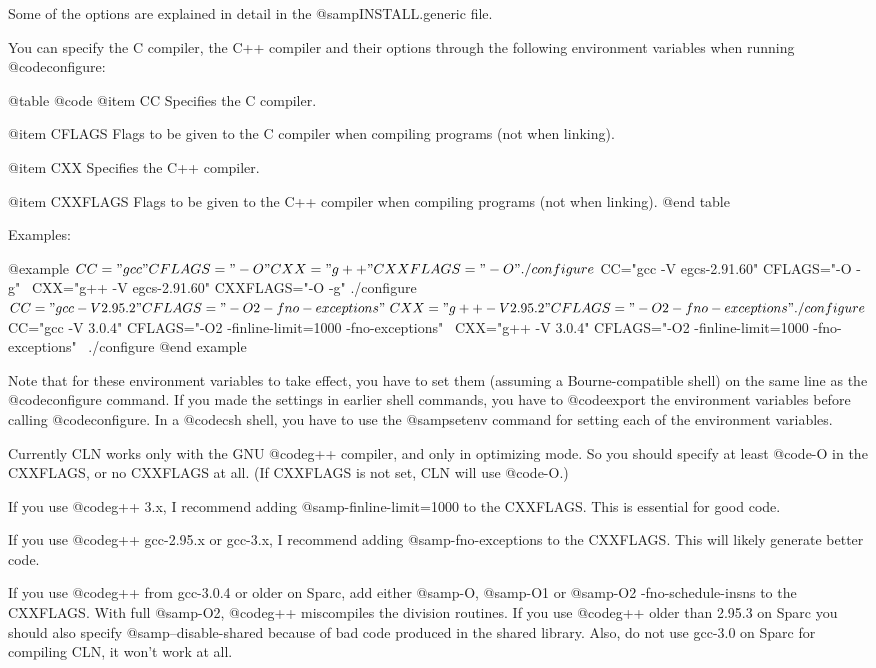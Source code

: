 Some of the options are explained in detail in the @samp{INSTALL.generic} file.

You can specify the C compiler, the C++ compiler and their options through
the following environment variables when running @code{configure}:

@table @code
@item CC
Specifies the C compiler.

@item CFLAGS
Flags to be given to the C compiler when compiling programs (not when linking).

@item CXX
Specifies the C++ compiler.

@item CXXFLAGS
Flags to be given to the C++ compiler when compiling programs (not when linking).
@end table

Examples:

@example
$ CC="gcc" CFLAGS="-O" CXX="g++" CXXFLAGS="-O" ./configure
$ CC="gcc -V egcs-2.91.60" CFLAGS="-O -g" \
  CXX="g++ -V egcs-2.91.60" CXXFLAGS="-O -g" ./configure
$ CC="gcc -V 2.95.2" CFLAGS="-O2 -fno-exceptions" \
  CXX="g++ -V 2.95.2" CFLAGS="-O2 -fno-exceptions" ./configure
$ CC="gcc -V 3.0.4" CFLAGS="-O2 -finline-limit=1000 -fno-exceptions" \
  CXX="g++ -V 3.0.4" CFLAGS="-O2 -finline-limit=1000 -fno-exceptions" \
  ./configure
@end example

Note that for these environment variables to take effect, you have to set
them (assuming a Bourne-compatible shell) on the same line as the
@code{configure} command. If you made the settings in earlier shell
commands, you have to @code{export} the environment variables before
calling @code{configure}. In a @code{csh} shell, you have to use the
@samp{setenv} command for setting each of the environment variables.

Currently CLN works only with the GNU @code{g++} compiler, and only in
optimizing mode. So you should specify at least @code{-O} in the CXXFLAGS,
or no CXXFLAGS at all. (If CXXFLAGS is not set, CLN will use @code{-O}.)

If you use @code{g++} 3.x, I recommend adding @samp{-finline-limit=1000}
to the CXXFLAGS. This is essential for good code.

If you use @code{g++} gcc-2.95.x or gcc-3.x, I recommend adding
@samp{-fno-exceptions} to the CXXFLAGS. This will likely generate better code.

If you use @code{g++} from gcc-3.0.4 or older on Sparc, add either
@samp{-O}, @samp{-O1} or @samp{-O2 -fno-schedule-insns} to the
CXXFLAGS. With full @samp{-O2}, @code{g++} miscompiles the division
routines. If you use @code{g++} older than 2.95.3 on Sparc you should
also specify @samp{--disable-shared} because of bad code produced in the
shared library. Also, do not use gcc-3.0 on Sparc for compiling CLN, it
won't work at all.

